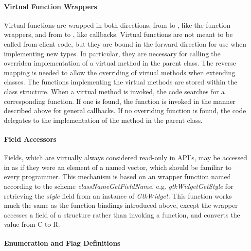 \documentclass[article]{jss}
\begin{document}
\paragraph{Virtual Function Wrappers}

Virtual functions are wrapped in both directions, from  to
, like the function wrappers, and from  to , like callbacks. Virtual functions are not meant to be called from client code, but they are bound in the forward direction for use when implementing new types. In 
particular, they are necessary for calling the overriden implementation of a virtual method in the parent class. The reverse mapping is needed to allow the overriding of virtual methods when extending  classes. The  functions implementing the virtual methods are stored within the  class structure. When a virtual method is invoked, the code searches for a corresponding  function. If one is found, the  function is invoked in the manner described above for general callbacks. If no overriding function is found, the code delegates to the implementation of the method in the parent class.


\paragraph{Field Accessors}

Fields, which are virtually always considered read-only in
 API's, may be accessed in  as if they were
an element of a named vector, which should be familiar to every
 programmer. This mechanism is based on an 
wrapper function named according to the scheme
\emph{classNameGetFieldName}, e.g. \emph{gtkWidgetGetStyle} for retrieving the \emph{style} field from an instance of \emph{GtkWidget}. %
This function works much the same as the function bindings introduced
above, except the  wrapper accesses a field of a
 structure rather than invoking a function, and converts
the value from C to R.

\paragraph{Enumeration and Flag Definitions}
\end{document}
